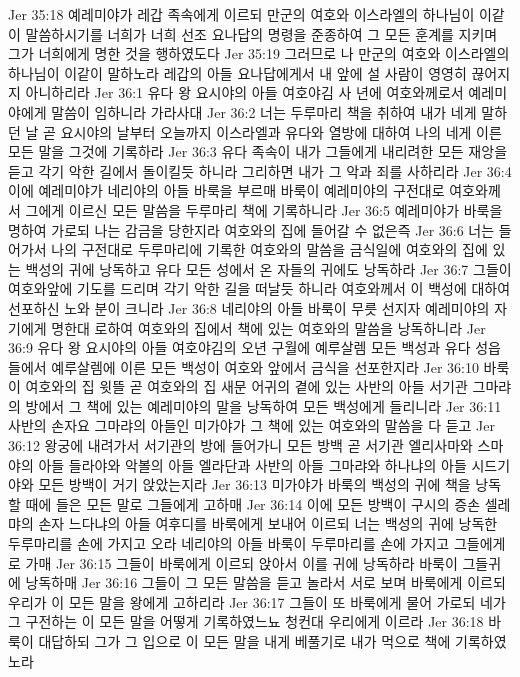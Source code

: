 Jer 35:18  예레미야가 레갑 족속에게 이르되 만군의 여호와 이스라엘의 하나님이 이같이 말씀하시기를 너희가 너희 선조 요나답의 명령을 준종하여 그 모든 훈계를 지키며 그가 너희에게 명한 것을 행하였도다
Jer 35:19  그러므로 나 만군의 여호와 이스라엘의 하나님이 이같이 말하노라 레갑의 아들 요나답에게서 내 앞에 설 사람이 영영히 끊어지지 아니하리라
Jer 36:1  유다 왕 요시야의 아들 여호야김 사 년에 여호와께로서 예레미야에게 말씀이 임하니라 가라사대
Jer 36:2  너는 두루마리 책을 취하여 내가 네게 말하던 날 곧 요시야의 날부터 오늘까지 이스라엘과 유다와 열방에 대하여 나의 네게 이른 모든 말을 그것에 기록하라
Jer 36:3  유다 족속이 내가 그들에게 내리려한 모든 재앙을 듣고 각기 악한 길에서 돌이킬듯 하니라 그리하면 내가 그 악과 죄를 사하리라
Jer 36:4  이에 예레미야가 네리야의 아들 바룩을 부르매 바룩이 예레미야의 구전대로 여호와께서 그에게 이르신 모든 말씀을 두루마리 책에 기록하니라
Jer 36:5  예레미야가 바룩을 명하여 가로되 나는 감금을 당한지라 여호와의 집에 들어갈 수 없은즉
Jer 36:6  너는 들어가서 나의 구전대로 두루마리에 기록한 여호와의 말씀을 금식일에 여호와의 집에 있는 백성의 귀에 낭독하고 유다 모든 성에서 온 자들의 귀에도 낭독하라
Jer 36:7  그들이 여호와앞에 기도를 드리며 각기 악한 길을 떠날듯 하니라 여호와께서 이 백성에 대하여 선포하신 노와 분이 크니라
Jer 36:8  네리야의 아들 바룩이 무릇 선지자 예레미야의 자기에게 명한대 로하여 여호와의 집에서 책에 있는 여호와의 말씀을 낭독하니라
Jer 36:9  유다 왕 요시야의 아들 여호야김의 오년 구월에 예루살렘 모든 백성과 유다 성읍들에서 예루살렘에 이른 모든 백성이 여호와 앞에서 금식을 선포한지라
Jer 36:10  바룩이 여호와의 집 윗뜰 곧 여호와의 집 새문 어귀의 곁에 있는 사반의 아들 서기관 그마랴의 방에서 그 책에 있는 예레미야의 말을 낭독하여 모든 백성에게 들리니라
Jer 36:11  사반의 손자요 그마랴의 아들인 미가야가 그 책에 있는 여호와의 말씀을 다 듣고
Jer 36:12  왕궁에 내려가서 서기관의 방에 들어가니 모든 방백 곧 서기관 엘리사마와 스마야의 아들 들라야와 악볼의 아들 엘라단과 사반의 아들 그마랴와 하나냐의 아들 시드기야와 모든 방백이 거기 앉았는지라
Jer 36:13  미가야가 바룩의 백성의 귀에 책을 낭독할 때에 들은 모든 말로 그들에게 고하매
Jer 36:14  이에 모든 방백이 구시의 증손 셀레먀의 손자 느다냐의 아들 여후디를 바룩에게 보내어 이르되 너는 백성의 귀에 낭독한 두루마리를 손에 가지고 오라 네리야의 아들 바룩이 두루마리를 손에 가지고 그들에게로 가매
Jer 36:15  그들이 바룩에게 이르되 앉아서 이를 귀에 낭독하라 바룩이 그들귀에 낭독하매
Jer 36:16  그들이 그 모든 말씀을 듣고 놀라서 서로 보며 바룩에게 이르되 우리가 이 모든 말을 왕에게 고하리라
Jer 36:17  그들이 또 바룩에게 물어 가로되 네가 그 구전하는 이 모든 말을 어떻게 기록하였느뇨 청컨대 우리에게 이르라
Jer 36:18  바룩이 대답하되 그가 그 입으로 이 모든 말을 내게 베풀기로 내가 먹으로 책에 기록하였노라
